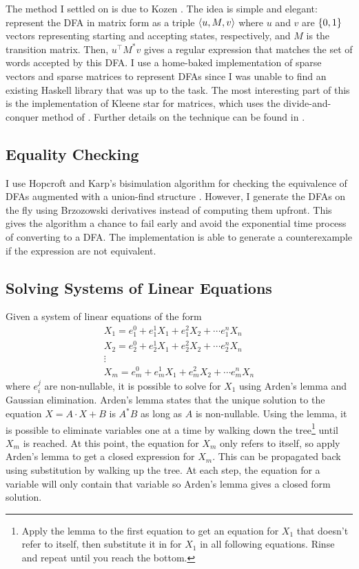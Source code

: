\documentclass[11pt]{article}
\newcommand{\transpose}{^\top}
\begin{document}
  The method I settled on is due to Kozen \cite{Kozen94}. The idea is simple and elegant: represent the DFA in matrix form as a triple $\langle u, M, v\rangle$ where $u$ and $v$ are $\lbrace0, 1\rbrace$ vectors representing starting and accepting states, respectively, and $M$ is the transition matrix. Then, $u\transpose M^* v$ gives a regular expression that matches the set of words accepted by this DFA\@. I use a home-baked implementation of sparse vectors and sparse matrices to represent DFAs since I was unable to find an existing Haskell library that was up to the task. The most interesting part of this is the implementation of Kleene star for matrices, which uses the divide-and-conquer method of \cite{Kozen94}. Further details on the technique can be found in \cite{Kozen94}.


\subsection{Equality Checking}

I use Hopcroft and Karp's bisimulation algorithm \cite{HopcroftK71} for checking the equivalence of DFAs augmented with a union-find structure \cite{BonchiP11}. However, I generate the DFAs on the fly using Brzozowski derivatives instead of computing them upfront. This gives the algorithm a chance to fail early and avoid the exponential time process of converting to a DFA\@. The implementation is able to generate a counterexample if the expression are not equivalent.


\subsection{Solving Systems of Linear Equations}

Given a system of linear equations of the form
\begin{gather*}
  X_1 = e_1^0 + e_1^1 X_1 + e_1^2 X_2 + \cdots e_1^n X_n\\
  X_2 = e_2^0 + e_2^1 X_1 + e_2^2 X_2 + \cdots e_2^n X_n\\
      \vdots\\
  X_m = e_m^0 + e_m^1 X_1 + e_m^2 X_2 + \cdots e_m^n X_n
\end{gather*}
where $e_i^j$ are non-nullable, it is possible to solve for $X_1$ using Arden's lemma and Gaussian elimination. Arden's lemma states that the unique solution to the equation $X = A \cdot X + B$ is $A^* B$ as long as $A$ is non-nullable. Using the lemma, it is possible to eliminate variables one at a time by walking down the tree\footnote{%
Apply the lemma to the first equation to get an equation for $X_1$ that doesn't refer to itself, then substitute it in for $X_1$ in all following equations. Rinse and repeat until you reach the bottom.} until $X_m$ is reached. At this point, the equation for $X_m$ only refers to itself, so apply Arden's lemma to get a closed expression for $X_m$. This can be propagated back using substitution by walking up the tree. At each step, the equation for a variable will only contain that variable so Arden's lemma gives a closed form solution.
\end{document}
